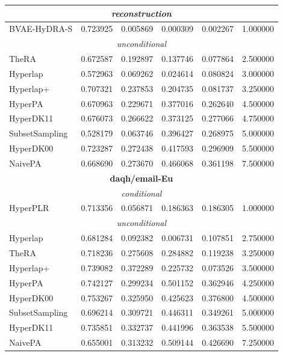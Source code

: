 \begin{tabular}{lrrrrr}
\midrule
\multicolumn{6}{c}{\emph{reconstruction}} \\
\midrule
BVAE-HyDRA-S & 0.723925 & 0.005869 & 0.000309 & 0.002267 & 1.000000 \\
\midrule
\multicolumn{6}{c}{\emph{unconditional}} \\
\midrule
TheRA & 0.672587 & 0.192897 & 0.137746 & 0.077864 & 2.500000 \\
Hyperlap & 0.572963 & 0.069262 & 0.024614 & 0.080824 & 3.000000 \\
Hyperlap+ & 0.707321 & 0.237853 & 0.204735 & 0.081737 & 3.250000 \\
HyperPA & 0.670963 & 0.229671 & 0.377016 & 0.262640 & 4.500000 \\
HyperDK11 & 0.676073 & 0.266622 & 0.373125 & 0.277066 & 4.750000 \\
SubsetSampling & 0.528179 & 0.063746 & 0.396427 & 0.268975 & 5.000000 \\
HyperDK00 & 0.723287 & 0.272438 & 0.417593 & 0.296909 & 5.500000 \\
NaivePA & 0.668690 & 0.273670 & 0.466068 & 0.361198 & 7.500000 \\
\midrule
\midrule
\multicolumn{6}{c}{\textbf{daqh/email-Eu}} \\
\midrule
\midrule
\multicolumn{6}{c}{\emph{conditional}} \\
\midrule
HyperPLR & 0.713356 & 0.056871 & 0.186363 & 0.186305 & 1.000000 \\
\midrule
\multicolumn{6}{c}{\emph{unconditional}} \\
\midrule
Hyperlap & 0.681284 & 0.092382 & 0.006731 & 0.107851 & 2.750000 \\
TheRA & 0.718236 & 0.275608 & 0.284882 & 0.119238 & 3.250000 \\
Hyperlap+ & 0.739082 & 0.372289 & 0.225732 & 0.073526 & 3.500000 \\
HyperPA & 0.742127 & 0.299234 & 0.501152 & 0.362946 & 4.250000 \\
HyperDK00 & 0.753267 & 0.325950 & 0.425623 & 0.376800 & 4.500000 \\
SubsetSampling & 0.696214 & 0.309721 & 0.446311 & 0.349261 & 5.000000 \\
HyperDK11 & 0.735851 & 0.332737 & 0.441996 & 0.363538 & 5.500000 \\
NaivePA & 0.655001 & 0.313232 & 0.509144 & 0.426690 & 7.250000 \\
\midrule
\bottomrule
\end{tabular}
\endgroup